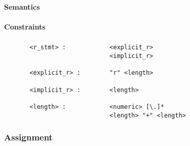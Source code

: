 \paragraph{Semantics}
\paragraph{Constraints}

\subsubsection{ }
\begin{verbatim}
       <r_stmt> :            <explicit_r>
                             <implicit_r>

       <explicit_r> :        "r" <length>

       <implicit_r> :        <length>

       <length> :            <numeric> [\.]*
                             <length> "+" <length>
\end{verbatim}

\subsubsection{Assignment}


